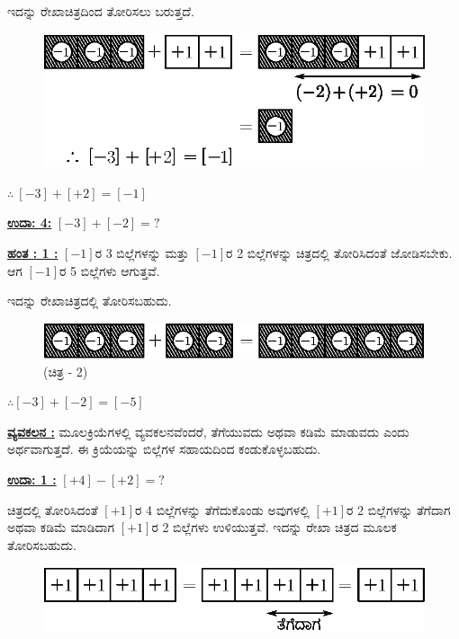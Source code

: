 \eject

ಇದನ್ನು ರೇಖಾಚಿತ್ರದಿಂದ ತೋರಿಸಲು ಬರುತ್ತದೆ.
\begin{figure}[H]
\centering
\includegraphics[scale=0.8]{src/figure/chap3/fig3-10b.eps}
\end{figure}
$\therefore \ [-3]+[+2]=[-1]$

\noindent
{\textbf{\underline{ಉದಾ: 4:}}} $[-3] + [-2] = ?$

\noindent
{\textbf{\underline{ಹಂತ : 1 :}}} $[-1]$ರ 3 ಬಿಲ್ಲೆಗಳನ್ನು ಮತ್ತು $[-1]$ರ 2 ಬಿಲ್ಲೆಗಳನ್ನು ಚಿತ್ರದಲ್ಲಿ ತೋರಿಸಿದಂತೆ ಜೋಡಿಸಬೇಕು. ಆಗ $[-1]$ರ 5 ಬಿಲ್ಲೆಗಳು ಆಗುತ್ತವೆ.

ಇದನ್ನು ರೇಖಾಚಿತ್ರದಲ್ಲಿ ತೋರಿಸಬಹುದು.
\begin{figure}[H]
\centering
\includegraphics{src/figure/chap3/fig3-11b.eps}
(ಚಿತ್ರ - 2)
\end{figure}

$\therefore [-3] + [-2] = [-5]$


\noindent
\medskip
{\textbf{\underline{ವ್ಯವಕಲನ :}}} ಮೂಲಕ್ರಿಯೆಗಳಲ್ಲಿ ವ್ಯವಕಲನವೆಂದರೆ, ತೆಗೆಯುವದು ಅಥವಾ ಕಡಿಮೆ ಮಾಡು\-ವದು ಎಂದು ಅರ್ಥವಾಗುತ್ತದೆ. ಈ ಕ್ರಿಯೆಯನ್ನು ಬಿಲ್ಲೆಗಳ ಸಹಾಯದಿಂದ ಕಂಡುಕೊಳ್ಳ\break ಬಹುದು.

\noindent
{\textbf{\underline{ಉದಾ: 1 :}}} $[+4] - [+2] = ?$

ಚಿತ್ರದಲ್ಲಿ ತೋರಿಸಿದಂತೆ $[+1]$ರ 4 ಬಿಲ್ಲೆಗಳನ್ನು ತೆಗೆದುಕೊಂಡು ಅವುಗಳಲ್ಲಿ $[+1]$ರ 2 ಬಿಲ್ಲೆಗಳನ್ನು ತೆಗೆದಾಗ ಅಥವಾ ಕಡಿಮೆ ಮಾಡಿದಾಗ $[+1]$ರ 2 ಬಿಲ್ಲೆಗಳು ಉಳಿಯುತ್ತವೆ. ಇದನ್ನು  ರೇಖಾ ಚಿತ್ರದ ಮೂಲಕ ತೋರಿಸಬಹುದು.
\begin{figure}[H]
\centering
\includegraphics{src/figure/chap3/fig3-12b.eps}
\end{figure}

